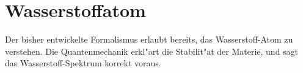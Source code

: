 \chapter{Wasserstoffatom}
\rhead{}
Der bisher entwickelte Formalismus erlaubt bereits, das Wasserstoff-Atom
zu verstehen. Die Quantenmechanik erkl"art die Stabilit"at der
Materie, und sagt das Wasserstoff-Spektrum korrekt voraus.
